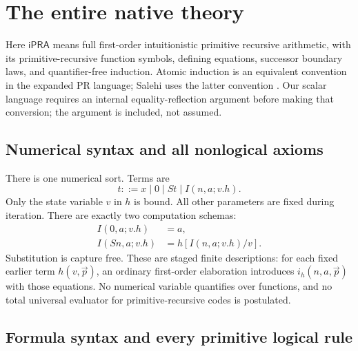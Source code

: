 \documentclass[11pt,letterpaper]{article}
\theoremstyle{definition}\newtheorem{definition}[theorem]{Definition}
\theoremstyle{remark}\newtheorem{remark}[theorem]{Remark}
\newcommand{\ipra}{\mathsf{iPRA}}
\begin{document}
\section{The entire native theory}
\label{sec:native}

Here \(\ipra\) means full first-order intuitionistic primitive recursive
arithmetic, with its primitive-recursive function symbols, defining
equations, successor boundary laws, and quantifier-free induction.
Atomic induction is an equivalent convention in the expanded PR language;
Salehi uses the latter convention \cite{salehi}. Our scalar language
requires an internal equality-reflection argument before making that
conversion; the argument is included, not assumed.

\subsection{Numerical syntax and all nonlogical axioms}

There is one numerical sort. Terms are
\[
 t ::= x\mid 0\mid St\mid I(n,a;v.h).
\]
Only the state variable \(v\) in \(h\) is bound. All other parameters
are fixed during iteration. There are exactly two computation schemas:
\begin{align}
 I(0,a;v.h)&=a,\tag{I0}\label{eq:i0}\\
 I(Sn,a;v.h)&=h[I(n,a;v.h)/v].\tag{IS}\label{eq:is}
\end{align}
Substitution is capture free. These are staged finite descriptions:
for each fixed earlier term \(h(v,\vec p)\), an ordinary first-order
elaboration introduces \(i_h(n,a,\vec p)\) with those equations.
No numerical variable quantifies over functions, and no total universal
evaluator for primitive-recursive codes is postulated.

\subsection{Formula syntax and every primitive logical rule}
\end{document}
